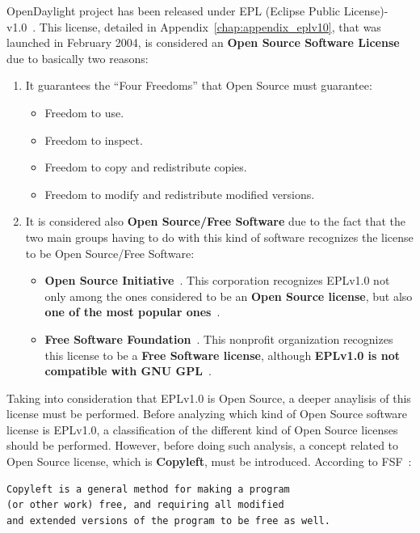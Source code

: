 \documentclass[a4paper, 12pt]{book}
\begin{document}
OpenDaylight project has been released under EPL (Eclipse Public License)-v1.0~\cite{EPLv1}. This license, detailed in Appendix~\ref{chap:appendix_eplv10}, that was launched in February 2004, is considered an \textbf{Open Source Software License} due to basically two reasons:
\begin{enumerate}\itemsep0pt
 \item {It guarantees the ``Four Freedoms'' that Open Source must guarantee}:
  \begin{itemize}\itemsep0pt
   \item{Freedom to use}.
   \item{Freedom to inspect}.
   \item{Freedom to copy and redistribute copies}.
   \item{Freedom to modify and redistribute modified versions}.
  \end{itemize}
 \item {It is considered also \textbf{Open Source/Free Software} due to the fact that the two main groups having to do with this kind of software recognizes the license to be Open Source/Free Software}:
  \begin{itemize}\itemsep0pt
   \item{\textbf{Open Source Initiative}~\cite{OpenSourceInitiative}}. This corporation recognizes EPLv1.0 not only among the ones considered to be an \textbf{Open Source license}, but also \textbf{one of the most popular ones}~\cite{OSILicenses}.
   \item{\textbf{Free Software Foundation}~\cite{FreeSoftwareFoundation}}. This nonprofit organization recognizes this license to be a \textbf{Free Software license}, although \textbf{EPLv1.0 is not compatible with GNU GPL}~\cite{FSFLicense}.
  \end{itemize}
\end{enumerate}
Taking into consideration that EPLv1.0 is Open Source, a deeper anaylisis of this license must be performed. Before analyzing which kind of Open Source software license is EPLv1.0, a classification of the different kind of Open Source licenses should be performed. However, before doing such analysis, a concept related to Open Source license, which is \textbf{Copyleft}, must be introduced. According to FSF~\cite{FSFCopyleft}:
\begin{verbatim}
Copyleft is a general method for making a program
(or other work) free, and requiring all modified
and extended versions of the program to be free as well.
\end{verbatim}
\end{document}
